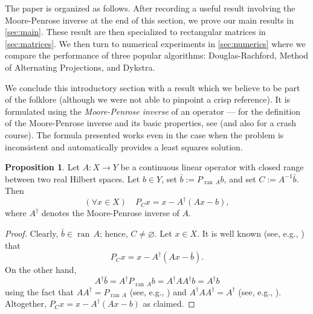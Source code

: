 \documentclass[12pt]{article}
\newcommand{\ran}{\ensuremath{{\operatorname{ran}}\,}}
\theoremstyle{definition}
\newtheorem{proposition}[theorem]{Proposition}
\providecommand{\ran}{\operatorname{ran}}
\providecommand{\ran}{\operatorname{ran}}
\begin{document}
{The paper is organized as follows.
After recording a useful result involving the Moore-Penrose 
inverse at the end of this section, 
we prove our main results in \cref{sec:main}. 
These result are then specialized to rectangular matrices 
in \cref{sec:matrices}. 
We then turn to numerical experiments in \cref{sec:numerics}
{ 
where we compare the performance of three popular algorithms: 
Douglas-Rachford, Method of Alternating Projections, and Dykstra.
}







We conclude this introductory section with a result
which we believe to be part of the folklore (although 
we were not able to pinpoint a crisp reference). 
{ 
It is formulated using the \emph{Moore-Penrose inverse} 
of an operator --- for the definition of the 
Moore-Penrose inverse and its basic properties, 
see \cite{Groetsch} (and also \cite[pages 57--59]{BC2017}
 for a crash course). 
The formula presented works even in the case when the problem
is inconsistent and automatically provides a least squares solution.
}

\begin{proposition}
\label{p:210416a}
Let $A\colon X\to Y$ be a continuous linear operator 
with closed range between two real Hilbert spaces. 
Let $b\in Y$, set $\bar{b}:= P_{\ran A}b$,
and set $C := A^{-1}\bar{b}$.
Then
\begin{equation}
(\forall x\in X)\quad P_Cx = x - A^\dagger(Ax-b),
\end{equation}
{ 
where $A^\dagger$ denotes the Moore-Penrose inverse of $A$.
}
\end{proposition}
\begin{proof}
Clearly, $\bar{b}\in \ran A$;
hence, $C\neq\varnothing$.
Let $x\in X$. 
It is well known 
(see, e.g., \cite[Example~29.17(ii)]{BC2017}) 
that 
\begin{equation}
P_{C}x = x - A^\dagger(Ax-\bar{b}).
\end{equation}
On the other hand,
\begin{equation}
A^\dagger\bar{b}
=A^\dagger P_{\ran A}b
=A^\dagger AA^\dagger b%
= A^\dagger b
\end{equation}
using the fact that 
$AA^\dagger = P_{\ran A}$ 
(see, e.g., \cite[Proposition~3.30(ii)]{BC2017})
and $A^\dagger A A^\dagger = A^\dagger$ 
(see, e.g., \cite[Section~II.2]{Groetsch}).
Altogether, $P_Cx=x-A^\dagger(Ax-b)$ as claimed.
\end{proof}


}
\end{document}
